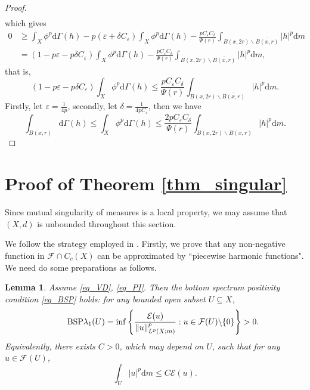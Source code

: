 \documentclass[11pt,a4paper]{article}
\numberwithin{equation}{section}
\theoremstyle{plain}
\newtheorem{lemma}[theorem]{Lemma}
\theoremstyle{definition}
\begin{document}
\begin{proof}
\begin{align*}
\end{align*}
which gives
\begin{align*}
0&\ge\int_X\phi^p\mathrm{d}\Gamma(h)-p(\varepsilon+\delta C_\varepsilon)\int_X\phi^p\mathrm{d}\Gamma(h)-\frac{pC_\varepsilon C_\delta }{\Psi(r)}\int_{B(x,2r)\backslash\overline{B(x,r)}}|h|^p\mathrm{d} m\\
&=\left(1-p\varepsilon-p\delta C_\varepsilon\right)\int_X\phi^p\mathrm{d}\Gamma(h)-\frac{pC_\varepsilon C_\delta }{\Psi(r)}\int_{B(x,2r)\backslash\overline{B(x,r)}}|h|^p\mathrm{d} m,
\end{align*}
that is,
$$\left(1-p\varepsilon-p\delta C_\varepsilon\right)\int_X\phi^p\mathrm{d}\Gamma(h)\le\frac{pC_\varepsilon C_\delta }{\Psi(r)}\int_{B(x,2r)\backslash\overline{B(x,r)}}|h|^p\mathrm{d} m.$$
Firstly, let $\varepsilon=\frac{1}{4p}$, secondly, let $\delta=\frac{1}{4pC_\varepsilon}$, then we have
$$\int_{B(x,r)}\mathrm{d}\Gamma(h)\le\int_X\phi^p\mathrm{d}\Gamma(h)\le\frac{2pC_\varepsilon C_\delta }{\Psi(r)}\int_{B(x,2r)\backslash\overline{B(x,r)}}|h|^p\mathrm{d} m.$$
\end{proof}

\section{Proof of Theorem \ref{thm_singular}}\label{sec_singular}

Since mutual singularity of measures is a local property, we may assume that $(X,d)$ is unbounded throughout this section.

We follow the strategy employed in \cite{KM20}. Firstly, we prove that any non-negative function in $\mathcal{F}\cap C_c(X)$ can be approximated by ``piecewise harmonic functions". We need do some preparations as follows.

\begin{lemma}\label{lem_calFU_Banach}
Assume \ref{eq_VD}, \ref{eq_PI}. Then the bottom spectrum positivity condition \ref{eq_BSP} holds: for any bounded open subset $U\subseteq X$,
\begin{equation*}\label{eq_BSP}\tag*{\text{BSP}}
\lambda_1(U)=\inf \left\{\frac{\mathcal{E}(u)}{\lVert u\rVert_{L^p(X;m)}^p}:u\in \mathcal{F}(U)\backslash \{0\}\right\}>0.
\end{equation*}
Equivalently, there exists $C>0$, which may depend on $U$, such that for any $u\in\mathcal{F}(U)$,
$$\int_U|u|^p\mathrm{d} m\le C\mathcal{E}(u).$$
\end{lemma}
\end{document}
